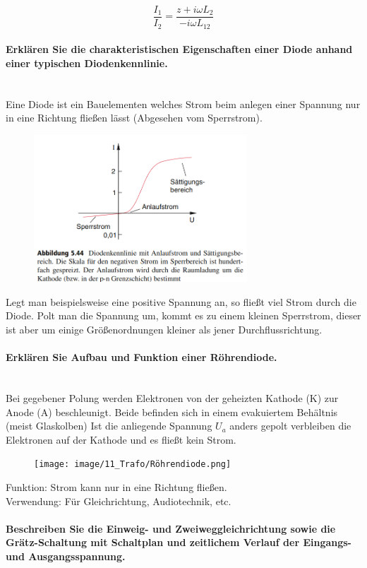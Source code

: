 \documentclass[a4paper, 11pt, parskip=half]{scrartcl}
\newcommand{\myparagraph}[1]{\paragraph{#1}\mbox{}\\}
\begin{document}
\begin{equation}
    \frac{I_1}{I_2} = \frac{z + i \omega L_2}{-i \omega L_{12}}
\end{equation}
\newpage
\myparagraph{Erklären Sie die charakteristischen Eigenschaften einer Diode anhand einer typischen
Diodenkennlinie.}
Eine Diode ist ein Bauelementen welches Strom beim anlegen einer Spannung nur in eine Richtung fließen lässt (Abgesehen vom Sperrstrom).
\begin{figure}[H]
    \centering
    \includegraphics[width=8cm]{image/11_Trafo/Diode_Kennlinie.png}
\end{figure}
Legt man beispielsweise eine positive Spannung an, so fließt viel Strom durch die Diode. Polt man die Spannung um, kommt es zu einem kleinen 
Sperrstrom, dieser ist aber um einige Größenordnungen kleiner als jener Durchflussrichtung.  
\myparagraph{Erklären Sie Aufbau und Funktion einer Röhrendiode.}
\hypertarget{diode_link}{Bei} gegebener Polung werden Elektronen von der geheizten Kathode (K) zur Anode (A) beschleunigt. Beide befinden sich in einem evakuiertem Behältnis (meist Glaskolben)
Ist die anliegende Spannung $U_a$ anders gepolt verbleiben die Elektronen auf der Kathode und es fließt kein Strom.  
\begin{figure}[H]
    \centering
    \texttt{[image: image/11\_Trafo/Röhrendiode.png]}
\end{figure}
Funktion: Strom kann nur in eine Richtung fließen. \\
Verwendung: Für Gleichrichtung, Audiotechnik, etc.
\myparagraph{Beschreiben Sie die Einweig- und Zweiweggleichrichtung sowie die Grätz-Schaltung mit
Schaltplan und zeitlichem Verlauf der Eingangs- und Ausgangsspannung.}
\end{document}

